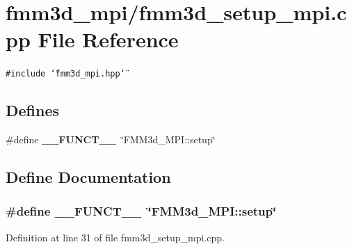 \section{fmm3d\_\-mpi/fmm3d\_\-setup\_\-mpi.cpp File Reference}
\label{fmm3d__setup__mpi_8cpp}


{\tt \#include \char`\"{}fmm3d\_\-mpi.hpp\char`\"{}}\par
\subsection*{Defines}
\begin{CompactItemize}
\item 
\#define {\bf \_\-\_\-FUNCT\_\-\_\-}~\char`\"{}FMM3d\_\-MPI::setup\char`\"{}
\end{CompactItemize}


\subsection{Define Documentation}
\subsubsection{\setlength{\rightskip}{0pt plus 5cm}\#define \_\-\_\-FUNCT\_\-\_\-~\char`\"{}FMM3d\_\-MPI::setup\char`\"{}}\label{fmm3d__setup__mpi_8cpp_2818853adf63a17949cf67d73c1d4473_2818853adf63a17949cf67d73c1d4473}




Definition at line 31 of file fmm3d\_\-setup\_\-mpi.cpp.